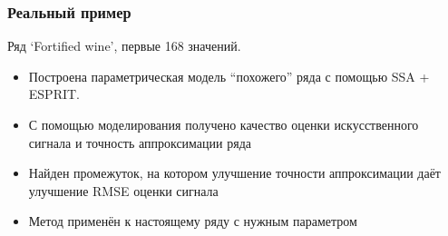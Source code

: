 \documentclass[unicode, notheorems]{beamer}
\begin{document}
\begin{frame}
	\frametitle{Реальный пример}
    Ряд `Fortified wine', первые 168 значений.
    \begin{itemize}
    	\item Построена параметрическая модель ``похожего'' ряда с помощью SSA + ESPRIT.
    	\item С помощью моделирования получено качество оценки искусственного сигнала и точность аппроксимации ряда
    	\item Найден промежуток, на котором улучшение точности аппроксимации даёт улучшение RMSE оценки сигнала
    	\item Метод применён к настоящему ряду с нужным параметром
    \end{itemize}
\end{frame}

%	
\end{document}
